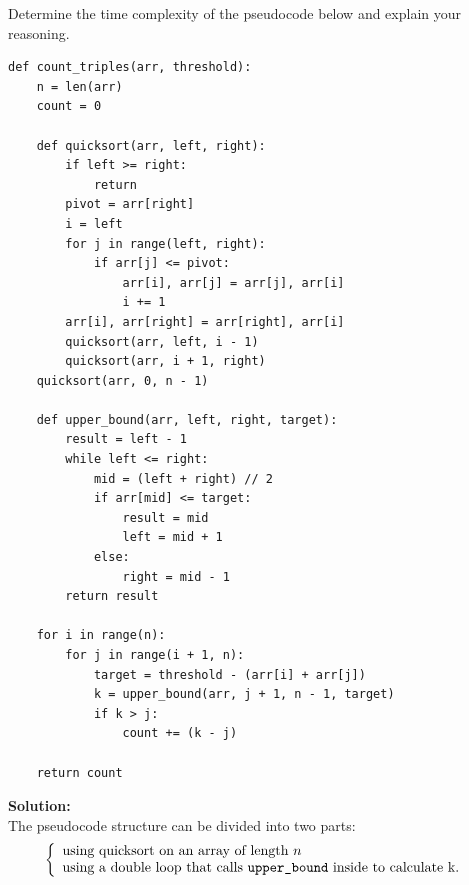 \problem{}



Determine the time complexity of the pseudocode below and explain your reasoning.

\begin{lstlisting}
def count_triples(arr, threshold):
    n = len(arr)
    count = 0
    
    def quicksort(arr, left, right):
        if left >= right:
            return
        pivot = arr[right]
        i = left
        for j in range(left, right):
            if arr[j] <= pivot:
                arr[i], arr[j] = arr[j], arr[i]
                i += 1
        arr[i], arr[right] = arr[right], arr[i]
        quicksort(arr, left, i - 1)
        quicksort(arr, i + 1, right)
    quicksort(arr, 0, n - 1)
    
    def upper_bound(arr, left, right, target):
        result = left - 1
        while left <= right:
            mid = (left + right) // 2
            if arr[mid] <= target:
                result = mid
                left = mid + 1
            else:
                right = mid - 1
        return result

    for i in range(n):
        for j in range(i + 1, n):
            target = threshold - (arr[i] + arr[j])
            k = upper_bound(arr, j + 1, n - 1, target)
            if k > j:
                count += (k - j)

    return count
\end{lstlisting}

\noindent \textbf{Solution:} \\

\noindent The pseudocode structure can be divided into two parts:
\[
\left\{
\begin{array}{l}
\text{using quicksort on an array of length $n$}  \\
\text{using a double loop that calls \texttt{upper\_bound} inside to calculate k. 
}
\end{array}
\right .
\]


